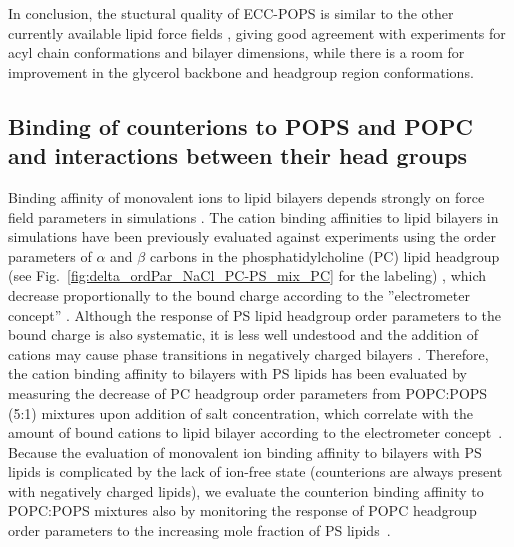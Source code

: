 \documentclass[journal=jpcbfk,manuscript=article]{achemso}
\begin{document}
In conclusion, the stuctural quality of ECC-POPS is similar to the other currently available
lipid force fields \cite{botan15, catte16, Pluhackova2016, nmrlipids_proj4},
giving good agreement with experiments for acyl chain conformations and bilayer dimensions,
while there is a room for improvement in the glycerol backbone and headgroup region
conformations.
 
\subsection{Binding of counterions to POPS and POPC and interactions between their head groups}
Binding affinity of monovalent ions to lipid bilayers depends strongly on
force field parameters in simulations \cite{catte16,NMRlipidsIV}.
The cation binding affinities to lipid bilayers in simulations have been previously evaluated
against experiments using the order parameters of $\alpha$ and $\beta$ carbons in the
phosphatidylcholine (PC) lipid headgroup (see Fig.~\ref{fig:delta_ordPar_NaCl_PC-PS_mix_PC} for the labeling) \cite{catte16,melcr18,NMRlipidsIV},
which decrease proportionally to the bound charge according to the ''electrometer concept'' \citep{seelig87}.
Although the response of PS lipid headgroup order parameters to the bound charge is also systematic,
it is less well undestood and the addition of cations may cause phase transitions in negatively charged
bilayers \cite{feigenson86,mattai89,roux91,roux90}.
Therefore, the cation binding affinity to bilayers with PS lipids has been evaluated by measuring the decrease
of PC headgroup order parameters from POPC:POPS (5:1) mixtures upon addition of salt concentration,
which correlate with the amount of bound cations to lipid bilayer according to the
electrometer concept~\cite{akutsu81,altenbach84,seelig87,roux90,catte16,NMRlipidsIV}.
Because the evaluation of monovalent ion binding affinity to bilayers with
PS lipids is complicated by the lack of ion-free state (counterions are always present with negatively charged lipids),
we evaluate the counterion binding affinity to POPC:POPS mixtures also by monitoring
the response of POPC headgroup order parameters to the increasing mole fraction of PS lipids~\cite{NMRlipidsIV}.
\end{document}
